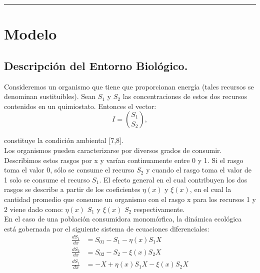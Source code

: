 \documentclass[letterpaper]{article}
\begin{document}
    \vspace{0.2cm}
        \rule{150mm}{0.5mm} %
    \vspace{0.2cm}

    \section{Modelo}{

        \subsection{Descripción del Entorno Biológico.}
        
        
        \normalsize{Consideremos un organismo que tiene que proporcionan energía (tales recursos se denominan sustituibles). Sean $S_1$ y $S_2$ las concentraciones de estos dos recursos contenidos en un quimiostato. Entonces el vector:}\\
        
        \begin{equation}
        I=\binom{S_{1}}{S_{2}},
        \end{equation}

        \normalsize{constituye la condición ambiental [7,8].}\\

        \normalsize{Los organismos pueden caracterizarse por diversos grados de consumir. Describimos estos rasgos por x y varían continuamente entre 0 y 1. Si el rasgo toma el valor 0, sólo se consume el recurso $S_2$ y cuando el rasgo toma el valor de 1 solo se consume el recurso $S_1$. El efecto general en el cual contribuyen los dos rasgos se describe a partir de los coeficientes $\eta(x)$  y $\xi(x)$, en el cual la cantidad promedio que consume un organismo con el rasgo x para los recursos 1 y 2 viene dado como:  $\eta(x)$ $S_1$ y $\xi(x)$ $S_2$ respectivamente.}\\

        \normalsize{En el caso de una población consumidora monomórfica, la dinámica ecológica está gobernada por el siguiente sistema de ecuaciones diferenciales:}\\

        \begin{equation}
        \begin{split}
             \frac{d S_1}{dx}&=S_{01}-S_1-\eta(x)S_1X\\  \frac{d S_2}{dx}&=S_{02}-S_2-\xi(x)S_2X\\ \frac{d S_1}{dx}&=-X+\eta(x)S_1X-\xi(x)S_2X 
        \end{split}
        \end{equation}

}
\end{document}
